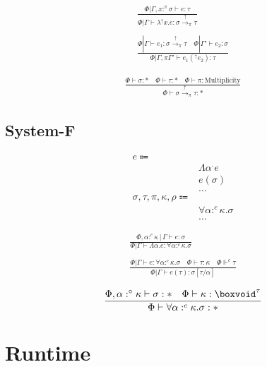 \documentclass {article}
\begin{document}
\begin{gather*}
\frac
{\Phi | \Gamma, x :^\pi \sigma \vdash e : \tau}
{\Phi | \Gamma \vdash \lambda^\uparrow x. e : \sigma \xrightarrow{\uparrow}_\pi \tau } \\
\\
\frac
{\Phi | \Gamma \vdash e_1 : \sigma \xrightarrow{\uparrow}_\pi \tau \quad \Phi | \Gamma' \vdash e_2 : \sigma}
{\Phi | \Gamma, \pi \Gamma' \vdash e_1(^\uparrow e_2) : \tau}
\end{gather*}

\begin{gather*}
\frac
{\Phi \vdash \sigma : * \quad \Phi \vdash \tau : * \quad \Phi \vdash \pi : \text{Multiplicity}}
{\Phi \vdash \sigma \xrightarrow{\uparrow}_\pi \tau  : * }
\end{gather*}

\subsection{System-F}
\begin{align*}
e \Coloneqq & \\
& \Lambda \alpha^. e \tag{Type Lambda} \\
& e (\sigma) \tag{Type Application} \\
& \dots \\
\sigma, \tau, \pi, \kappa, \rho \Coloneqq & \\
& \forall \alpha :^c \kappa. \sigma \tag{Type Poly}\\ 
& \dots
\end{align*}

\begin{gather*}
\frac
{\Phi, \alpha :^c \kappa \, | \, \Gamma \vdash e : \sigma}
{\Phi | \Gamma \vdash \Lambda \alpha. e : \forall \alpha :^c \kappa. \sigma } \\
\\
\frac
{\Phi | \Gamma \vdash e : \forall \alpha :^c \kappa. \sigma \quad \Phi \vdash \tau : \kappa \quad \Phi \Vdash^c \tau}
{\Phi | \Gamma \vdash e (\tau) : \sigma [\tau/\alpha] }
\end{gather*}

\begin{gather*}
\frac
{\Phi, \alpha :^\circ \kappa \vdash \sigma : * \quad \Phi \vdash \kappa : \boxvoid^\tau}
{\Phi \vdash \forall \alpha :^c \kappa. \sigma : * } \\
\end{gather*}

\section{Runtime}
\end{document}
